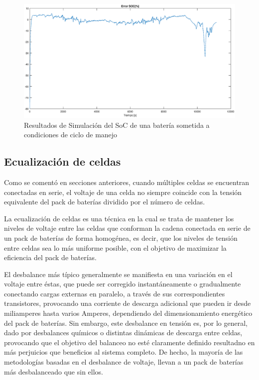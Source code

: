 \documentclass[10pt,a4paper]{article}
\begin{document}
	\begin{figure}[h!]
		\begin{center}
			\includegraphics[width=1\textwidth]{soc_error_porc.eps}
			\caption{Resultados de Simulación del SoC de una batería sometida a 
                     condiciones de ciclo de manejo}
			\label{error_SoC_Sim}
		\end{center}
	\end{figure}
	
	\clearpage
	
	\subsection{Ecualización de celdas}
	
	Como se comentó en secciones anteriores, cuando múltiples celdas 
    se encuentran conectadas en serie, el voltaje de una celda no siempre 
    coincide con la tensión equivalente del pack de baterías dividido por el 
    número de celdas. 
	
	\noindent La ecualización de celdas es una técnica en la cual se trata de 
    mantener los niveles de voltaje entre las celdas que conforman la cadena 
    conectada en serie de un pack de baterías de forma homogénea, es decir, que 
    los niveles de tensión entre celdas sea lo más uniforme posible, con el 
    objetivo de maximizar la eficiencia del pack de baterías.
	
	\noindent El desbalance más típico generalmente se manifiesta en una 
    variación en el voltaje entre éstas, que puede ser corregido 
    instantáneamente o gradualmente conectando cargas externas en paralelo, a 
    través de sus correspondientes transistores, provocando una corriente de 
    descarga adicional que pueden ir desde miliamperes hasta varios Amperes, 
    dependiendo del dimensionamiento energético del pack de baterías. 
    Sin embargo, este desbalance en tensión es, por lo general, dado por 
    desbalances químicos o distintas dinámicas de descarga entre celdas, 
    provocando que el objetivo del balanceo no esté claramente definido 
    resultadno en más perjuicios que beneficios al sistema completo. 
    De hecho, la mayoría de las metodologías basadas en el desbalance de 
    voltaje, llevan a un pack de baterías más desbalanceado que sin ellos.
\end{document}

